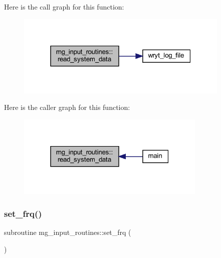 Here is the call graph for this function\+:
\nopagebreak
\begin{figure}[H]
\begin{center}
\leavevmode
\includegraphics[width=289pt]{namespacemg__input__routines_a77a7419ce373edc9895839fc0d469d78_cgraph}
\end{center}
\end{figure}
Here is the caller graph for this function\+:
\nopagebreak
\begin{figure}[H]
\begin{center}
\leavevmode
\includegraphics[width=256pt]{namespacemg__input__routines_a77a7419ce373edc9895839fc0d469d78_icgraph}
\end{center}
\end{figure}
\mbox{\label{namespacemg__input__routines_ac8682ae293c93e95b72b4b7c222f9ed4}} 
\subsubsection{\texorpdfstring{set\+\_\+frq()}{set\_frq()}}
{\footnotesize\ttfamily subroutine mg\+\_\+input\+\_\+routines\+::set\+\_\+frq (\begin{DoxyParamCaption}{ }\end{DoxyParamCaption})}

